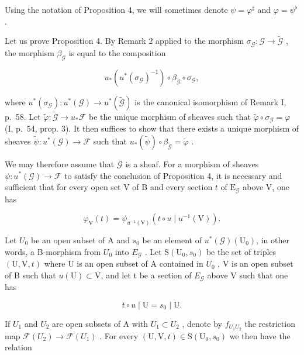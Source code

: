 Using the notation of Proposition 4, we will sometimes denote \(\psi = \varphi^{\sharp}\) and \(\varphi = \psi^{\flat}\) .

Let us prove Proposition 4. By Remark 2 applied to the morphism \(\sigma_{\mathcal{G}}: \mathcal{G} \to \widetilde{\mathcal{G}}\) , the morphism \(\beta_{\mathcal{G}}\) is equal to the composition

\[
u _ {*} (u ^ {*} (\sigma_ {\mathcal {G}}) ^ {- 1}) \circ \beta_ {\widetilde {\mathcal {G}}} \circ \sigma_ {\mathcal {G}},
\]

where \(u^{*}(\sigma_{\mathcal{G}}) \colon u^{*}(\mathcal{G}) \to u^{*}(\widetilde{\mathcal{G}})\) is the canonical isomorphism of Remark I, p.~58. Let \(\widetilde{\varphi} \colon \widetilde{\mathcal{G}} \to u_{*}\mathcal{F}\) be the unique morphism of sheaves such that \(\widetilde{\varphi} \circ \sigma_{\mathcal{G}} = \varphi\) (I, p.~54, prop. 3). It then suffices to show that there exists a unique morphism of sheaves \(\widetilde{\psi} \colon u^{*}(\mathcal{G}) \to \mathcal{F}\) such that \(u_{*}(\widetilde{\psi}) \circ \beta_{\widetilde{\mathcal{G}}} = \widetilde{\varphi}\) .

We may therefore assume that \(\mathcal{G}\) is a sheaf. For a morphism of sheaves \(\psi: u^{*}(\mathcal{G}) \to \mathcal{F}\) to satisfy the conclusion of Proposition 4, it is necessary and sufficient that for every open set V of B and every section \(t\) of \(\mathrm{E}_{\mathcal{G}}\) above V, one has

\[
\varphi_{\mathrm{V}}(t) = \psi_{u^{-1}(\mathrm{V})}(t \circ u \mid u^{-1}(\mathrm{V})).\tag{6}
\]

Let \(U_{0}\) be an open subset of A and \(s_{0}\) be an element of \(u^{*}(\mathcal{G})(\mathrm{U}_{0})\), in other words, a B-morphism from \(U_{0}\) into \(E_{\mathcal{G}}\) . Let \(\mathrm{S}(\mathrm{U}_{0}, s_{0})\) be the set of triples \((\mathrm{U}, \mathrm{V}, t)\) where U is an open subset of A contained in \(U_{0}\) , V is an open subset of B such that \(u(\mathrm{U}) \subset \mathrm{V}\), and let t be a section of \(E_{\mathcal{G}}\) above V such that one has

\[
t \circ u \mid \mathrm{U} = s _ {0} \mid \mathrm{U}.\tag{7}
\]

If \(U_{1}\) and \(U_{2}\) are open subsets of A with \(U_{1} \subset U_{2}\) , denote by \(f_{U_{1}U_{2}}\) the restriction map \(\mathcal{F}(U_{2}) \to \mathcal{F}(U_{1})\) . For every \((\mathrm{U}, \mathrm{V}, t) \in \mathrm{S}(\mathrm{U}_{0}, s_{0})\) we then have the relation

